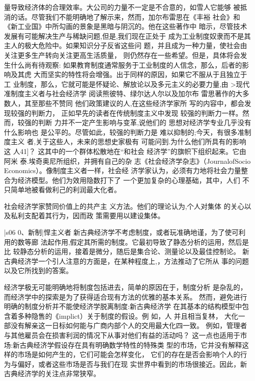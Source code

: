 量导致经济体的合理效率。大公司的力量不一定是不合意的，如雪人它能够
被抵消的话。尽管我们不能明确地了解示来，然而，加尔布雷思在《丰裕
社会》和《新工业国》中所勾画的景象是黑暗与阴沉的。他在这些著作中
暗示，尽管技术发展有可能解决生产与稀缺问题,但是,我们现在正处于
成为工业制度奴隶而不是其主人的极大危险中。如果知识分子反省这些问
题，并且成为一种力量，使社会由关注更多生产转向关注更高生活质量，
则仍然存在一些希望。但是，具体将会发生什么尚有待观察:
如果教育制度通常服务于工业制度的人信念，那么，后者的影响及其虎
大而坚实的特性将会增强。出于同样的原因，如果它不服从于且独立于工
业制度，那么，它就可能是怀疑论、解放论以及多元主义的必要力量,由
>现代准制度主义者与社会经济学
阅读熊彼特、绿尔达人尔以及加尔布
雷思著作的大多数人，其至那些不赞同
他们政策建议的人,在这些经济学家所
写的内容中，都会发现较强的判断力，
正如早先的读者在传统制度主义中发现
较强的判断力一样。然而，较强的判断
力并不一定产生影响与变革,说他们的
思想对经济学专业几乎没有什么影响也
是公平的。尽管如此，较强的判断力是
难以抑制的;今天，有很多准制度主义
者,关于这些人，未来的思想史家极有
可能问到.为什么他们所具有的影响这
人41]？
这其中的一个群体松散地在“和社会
经济学”的旗帜下组织起来。它由阿米
泰.埃奇奥尼所组织，并拥有自己的杂
志《社会经济学杂志》（JournalofSocio
Economics）。像制度主义者一样，社会经
济学家认为，必须有力地将社会力量整
合为经济模型。他们为效用隐数打下了
一个更加复杂的心理基础，其中，人们
不只简单地被看做利己的利润最大化者。

社会经济学家赞同价值上的共产主
义方法。他们的理论认为,个人对集体
的关心以及私利支配着其行为，因而政
策需要用以建设集体。



|s06
0、新制|悍主义者
新古典经济学不考虑制度，或者玩准确地谨，为了使可利用的数等廊
法起作用,假定其所需的制度。它最初导致了静态分析的运用，然后是比
较静态分析的运用，接着是微分，随后是集合论、测量论以及最佳控制论。
新古典经济学一个引人注意的方面是，在某种程度上,，方法推动了它所从
事的问题以及它所找到的答案。

经济学极无可能明确地将制度包括进去，简单的原因在于，制度分析
是杂乱的，而经济学中的探索是为了获得适合现有方法的优雅的基本关系。
然而，避免进行明确的制度分析并不能使经济学脱离制度:新古典经济学
在其基本的结构模型中包含着多种隐售的《implict）关于制度的假设。例
如，人
并且相当复林，
大化一部没有解亲这一日标如何能与广商内部个人的交用最大化四一致。
例如，管理者与其他雇员会在损害利润的情况下从事对他们有益的活动吗？
这一点也适用于市场:新古典经济学假设存在具有明确数学特性的特殊类
型的市场，它并没有解释这样的市场是如何产生的，它们可能会怎样变化，
它们的存在是否会影响个人的行为与偏好，或者这些市场是否与我们在现
实世界中看到的市场很接近。因此，新古典经济学的关注点非常狭窄。

